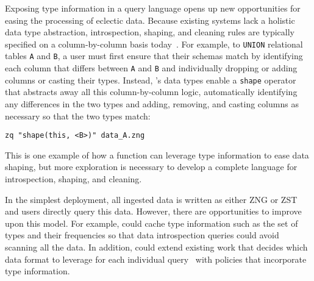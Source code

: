  Exposing type information in a query language opens up new opportunities for easing the processing of eclectic data. Because existing systems lack a holistic data type abstraction, introspection, shaping, and cleaning rules are typically specified on a column-by-column basis today~\cite{bidel, codel}. For example, to \texttt{UNION} relational tables \texttt{A} and \texttt{B}, a user must first ensure that their schemas match by identifying each column that differs between \texttt{A} and \texttt{B} and individually dropping or adding columns or casting their types. Instead, \sys{}'s data types enable a \texttt{shape} operator that abstracts away all this column-by-column logic, automatically identifying any differences in the two types and adding, removing, and casting columns as necessary so that the two types match:

\texttt{zq "shape(this, <B>)" data\_A.zng}

\noindent{}This is one example of how a function can leverage type information to ease data shaping, but more exploration is necessary to develop a complete language for introspection, shaping, and cleaning.

 In the simplest \sys{} deployment, all ingested data is written as either ZNG or ZST and users directly query this data. However, there are opportunities to improve upon this model. For example, \sys{} could cache type information such as the set of types and their frequencies so that data introspection queries could avoid scanning all the data. In addition, \sys{} could extend existing work that decides which data format to leverage for each individual query~\cite{octopusdb, h2o,peloton,tidb,one_size_fits_all_2007} with policies that incorporate type information.



